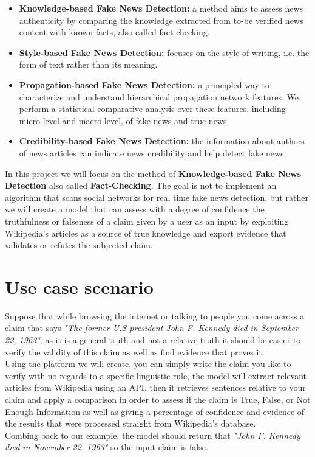 \documentclass[10pt, english]{report}
\begin{document}
\begin{itemize}
\item \textbf{Knowledge-based Fake News Detection:} a method aims to assess news authenticity by comparing the knowledge extracted from to-be verified news content with known facts, also called fact-checking.
\item \textbf{Style-based Fake News Detection:} focuses on the style of writing, i.e. the form of text rather than its meaning.
\item \textbf{Propagation-based Fake News Detection:} a principled way to characterize and understand hierarchical propagation network features. We perform a statistical comparative analysis over these features, including micro-level and macro-level, of fake news and true news.
\item \textbf{Credibility-based Fake News Detection:} the information about authors of news articles can indicate news credibility and help detect fake news.
\end{itemize}

In this project we will focus on the method of \textbf{Knowledge-based Fake News Detection} also called \textbf{Fact-Checking}. The goal is not to implement an algorithm that scans social networks for real time fake news detection, but rather we will create a model that can assess with a degree of confidence the truthfulness or falseness of a claim given by a user as an input by exploiting Wikipedia's articles as a source of true knowledge and export evidence that validates or refutes the subjected claim.

\section{Use case scenario}
Suppose that while browsing the internet or talking to people you come across a claim that says \textit{"The former U.S president John F. Kennedy died in September 22, 1963"}, as it is a general truth and not a relative truth it should be easier to verify the validity of this claim as well as find evidence that proves it.\\
Using the platform we will create, you can simply write the claim you like to verify with no regards to a specific linguistic rule, the model will extract relevant articles from Wikipedia using an API, then it retrieves sentences relative to your claim and apply a comparison in order to assess if the claim is True, False, or Not Enough Information as well as giving a percentage of confidence and evidence of the results that were processed straight from Wikipedia's database.\\
Combing back to our example, the model should return that \textit{"John F. Kennedy died in November 22, 1963"} so the input claim is false.
\end{document}
